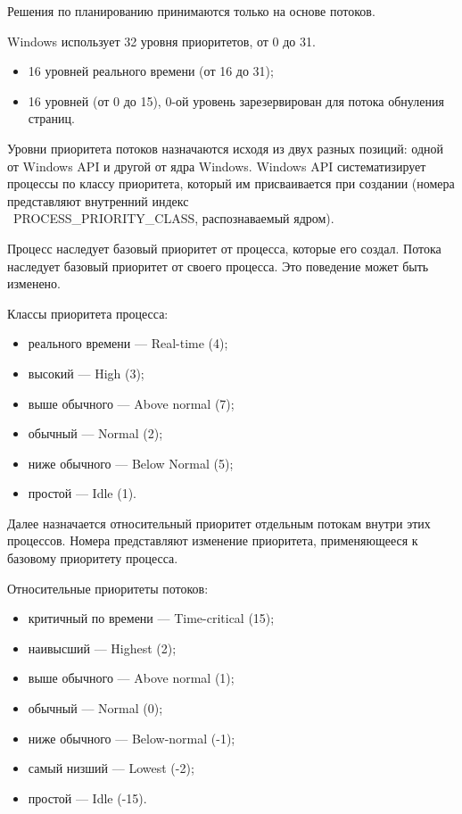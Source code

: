 Решения по планированию принимаются только на основе потоков.

Windows использует 32 уровня приоритетов, от 0 до 31.
\begin{itemize}
	\item 16 уровней реального времени (от 16 до 31);
	\item 16 уровней (от 0 до 15), 0-ой уровень зарезервирован для потока обнуления страниц.
\end{itemize}

Уровни приоритета потоков назначаются исходя из двух разных позиций:
одной от Windows API и другой от ядра Windows.
Windows API систематизирует процессы по классу приоритета, который им присваивается при создании
(номера представляют внутренний индекс ~\\~PROCESS\_PRIORITY\_CLASS, распознаваемый ядром).

Процесс наследует базовый приоритет от процесса, которые его создал. 
Потока наследует базовый приоритет от своего процесса. Это поведение
может быть изменено.

Классы приоритета процесса:
\begin{itemize}
	\item реального времени --- Real-time (4);
	\item высокий --- High (3);
	\item выше обычного --- Above normal (7);
	\item обычный --- Normal (2);
	\item ниже обычного --- Below Normal (5);
	\item простой --- Idle (1).
\end{itemize}

Далее назначается относительный приоритет отдельным потокам внутри 
этих процессов. Номера представляют изменение приоритета,
применяющееся к базовому приоритету процесса.

Относительные приоритеты потоков:
\begin{itemize}
	\item критичный по времени --- Time-critical (15);
	\item наивысший --- Highest (2);
	\item выше обычного --- Above normal (1);
	\item обычный --- Normal (0);
	\item ниже обычного --- Below-normal (-1);
	\item самый низший --- Lowest (-2);
	\item простой --- Idle (-15).
\end{itemize}

